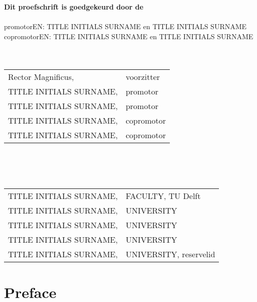 \documentclass{abe}
\begin{document}
\clearpage%
\begin{flushleft}
{\bfseries\large Dit proefschrift is goedgekeurd door de}\\
\vspace{-2mm}\abeblackrule\\
\vspace{6.5pt}promotorEN: TITLE INITIALS SURNAME en TITLE INITIALS SURNAME\\
copromotorEN: TITLE INITIALS SURNAME en TITLE INITIALS SURNAME\\
\vspace{26pt}{\bfseries\large Samenstelling promotiecommissie bestaat uit}\\
\vspace{-2mm}\abeblackrule\\
\vspace{6.5pt}
\begin{tabularx}{\textwidth}{@{}XX@{}}
Rector Magnificus, & voorzitter \\
TITLE INITIALS SURNAME, & promotor \\
TITLE INITIALS SURNAME, & promotor \\
TITLE INITIALS SURNAME, & copromotor \\
TITLE INITIALS SURNAME, & copromotor \\
\end{tabularx}\\
\vspace{26pt}{\bfseries\large Onafhankelijke leden}\\
\vspace{-2mm}\abeblackrule\\
\vspace{6.5pt}
\begin{tabularx}{\textwidth}{@{}XX@{}}
TITLE INITIALS SURNAME, & FACULTY, TU Delft \\
TITLE INITIALS SURNAME, & UNIVERSITY \\
TITLE INITIALS SURNAME, & UNIVERSITY \\
TITLE INITIALS SURNAME, & UNIVERSITY \\
TITLE INITIALS SURNAME, & UNIVERSITY, reservelid \\
\end{tabularx}
\end{flushleft}

\tableofcontents

\chapter{Preface}
\end{document}
